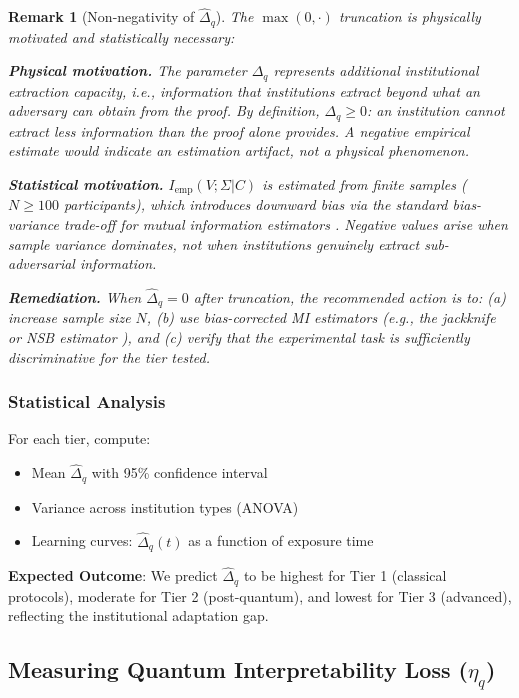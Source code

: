 \documentclass{ieeeaccess}
\newtheorem{remark}{Remark}[section]
\begin{document}
\begin{remark}[Non-negativity of $\hat{\Delta}_q$]
The $\max(0, \cdot)$ truncation is physically motivated and 
statistically necessary:

\textbf{Physical motivation.} The parameter $\Delta_q$ represents 
additional institutional extraction capacity, i.e., information that 
institutions extract \emph{beyond} what an adversary can obtain from 
the proof. By definition, $\Delta_q \geq 0$: an institution cannot 
extract less information than the proof alone provides. A negative 
empirical estimate would indicate an estimation artifact, not a 
physical phenomenon.

\textbf{Statistical motivation.} $I_{\text{emp}}(V;\Sigma|C)$ is 
estimated from finite samples ($N \geq 100$ participants), which 
introduces downward bias via the standard bias-variance trade-off 
for mutual information estimators \cite{Paninski2003}. Negative 
values arise when sample variance dominates, not when institutions 
genuinely extract sub-adversarial information.

\textbf{Remediation.} When $\hat{\Delta}_q = 0$ after truncation, 
the recommended action is to: (a) increase sample size $N$, 
(b) use bias-corrected MI estimators (e.g., the jackknife or 
NSB estimator \cite{Nemenman2002}), and (c) verify that the 
experimental task is sufficiently discriminative for the tier tested.
\end{remark}


\subsubsection{Statistical Analysis}

For each tier, compute:
\begin{itemize}
    \item Mean $\hat{\Delta}_q$ with 95\% confidence interval
    \item Variance across institution types (ANOVA)
    \item Learning curves: $\hat{\Delta}_q(t)$ as a function of exposure time
\end{itemize}

\textbf{Expected Outcome}: We predict $\hat{\Delta}_q$ to be highest for Tier 1 (classical protocols), moderate for Tier 2 (post-quantum), and lowest for Tier 3 (advanced), reflecting the institutional adaptation gap.

\subsection{Measuring Quantum Interpretability Loss ($\eta_q$)}
\end{document}
